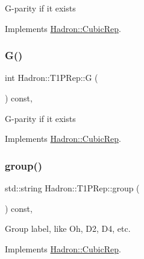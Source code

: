 G-\/parity if it exists 

Implements \mbox{\hyperlink{structHadron_1_1CubicRep_a52104e43266d1614c00bbd1c3b395458}{Hadron\+::\+Cubic\+Rep}}.

\mbox{\label{structHadron_1_1T1PRep_ab9f492c9418a9100a8c3cef867831758}} 
\subsubsection{\texorpdfstring{G()}{G()}\hspace{0.1cm}{\footnotesize\ttfamily [3/3]}}
{\footnotesize\ttfamily int Hadron\+::\+T1\+P\+Rep\+::G (\begin{DoxyParamCaption}{ }\end{DoxyParamCaption}) const\hspace{0.3cm}{\ttfamily [inline]}, {\ttfamily [virtual]}}

G-\/parity if it exists 

Implements \mbox{\hyperlink{structHadron_1_1CubicRep_a52104e43266d1614c00bbd1c3b395458}{Hadron\+::\+Cubic\+Rep}}.

\mbox{\label{structHadron_1_1T1PRep_a9e319545acc323df42a4668547bac994}} 
\subsubsection{\texorpdfstring{group()}{group()}\hspace{0.1cm}{\footnotesize\ttfamily [1/3]}}
{\footnotesize\ttfamily std\+::string Hadron\+::\+T1\+P\+Rep\+::group (\begin{DoxyParamCaption}{ }\end{DoxyParamCaption}) const\hspace{0.3cm}{\ttfamily [inline]}, {\ttfamily [virtual]}}

Group label, like Oh, D2, D4, etc. 

Implements \mbox{\hyperlink{structHadron_1_1CubicRep_a0748f11ec87f387062c8e8981339a29c}{Hadron\+::\+Cubic\+Rep}}.

\mbox{\label{structHadron_1_1T1PRep_a9e319545acc323df42a4668547bac994}} 
